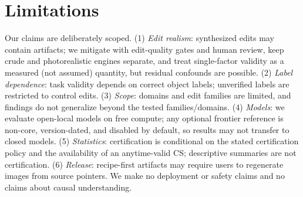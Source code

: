 \section{Limitations}

Our claims are deliberately scoped. (1) \emph{Edit realism}: synthesized edits may
contain artifacts; we mitigate with edit-quality gates and human review, keep
crude and photorealistic engines separate, and treat single-factor validity as a
measured (not assumed) quantity, but residual confounds are possible. (2)
\emph{Label dependence}: task validity depends on correct object labels; unverified
labels are restricted to control edits. (3) \emph{Scope}: domains and edit
families are limited, and findings do not generalize beyond the tested
families/domains. (4) \emph{Models}: we evaluate open-local models on free compute;
any optional frontier reference is non-core, version-dated, and disabled by
default, so results may not transfer to closed models. (5) \emph{Statistics}:
certification is conditional on the stated certification policy and the
availability of an anytime-valid CS; descriptive summaries are not certification.
(6) \emph{Release}: recipe-first artifacts may require users to regenerate images
from source pointers. We make no deployment or safety claims and no claims about causal understanding.
